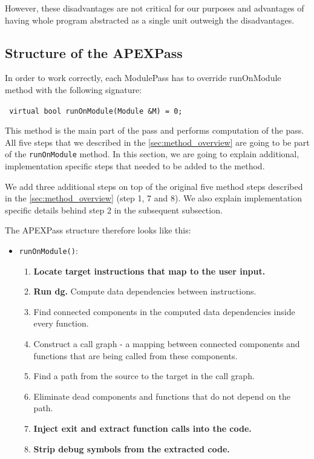 \documentclass[12pt, twoside]{fithesis2}
\renewcommand{\_}{\leavevmode \kern0.07em\vbox{\hrule width0.4em}}
\newcommand{\squarebullet}{\textcolor{black}{\raisebox{0.15em}{\rule{4pt}{4pt}}}}
\newenvironment{myItemize}{
  \begin{itemize}[
    leftmargin=2em,
    rightmargin=1em,
    itemsep=\parskip,
    parsep=0em,
    topsep=0em,
    partopsep=0em
]
  \renewcommand{\labelitemi}{\squarebullet}
  \renewcommand{\labelitemii}{\textbullet}
}{
  \end{itemize}
}
\newenvironment{myEnumerate}{
  \begin{enumerate}[
    leftmargin=2em,
    rightmargin=1em,
    itemsep=\parskip,
    parsep=0em,
    topsep=0em,
    partopsep=0em
]
}{
  \end{enumerate}
}
\begin{document}
However, these disadvantages are not critical for our purposes and advantages
of having whole program abstracted as a single unit outweigh the disadvantages.

\subsection{Structure of the APEXPass}

In order to work correctly, each ModulePass has to override runOnModule method
with the following signature:

\texttt{
virtual bool runOnModule(Module &M) = 0;
}

This method is the main part of the pass and performs computation of the pass.
All five steps that we described in the \autoref{sec:method_overview} are going
to be part of the \texttt{runOnModule} method.
In this section, we are going to explain
additional, implementation specific steps that needed to be added to
the method.

We add three additional steps on top of the original five method steps
described in the \autoref{sec:method_overview} (step 1, 7 and 8). We also
explain implementation specific details behind step 2 in the subsequent
subsection.

The APEXPass structure therefore looks like this:

\begin{myItemize}
\item{\texttt{runOnModule()}:}

\begin{myEnumerate}
\item{\textbf{Locate target instructions that map to the user input.}}
\item \textbf{Run dg.} Compute data dependencies between instructions.
\item Find connected components in the computed data dependencies inside
every function.
\item Construct a call graph - a mapping between connected components and functions
that are being called from these components.
\item Find a path from the source to the target in the call graph.
\item Eliminate dead components and functions that do not depend on the path.
\item{\textbf{Inject exit and extract function calls into the code.}}
\item{\textbf{Strip debug symbols from the extracted code.}}
\end{myEnumerate}

\end{myItemize}
\end{document}
